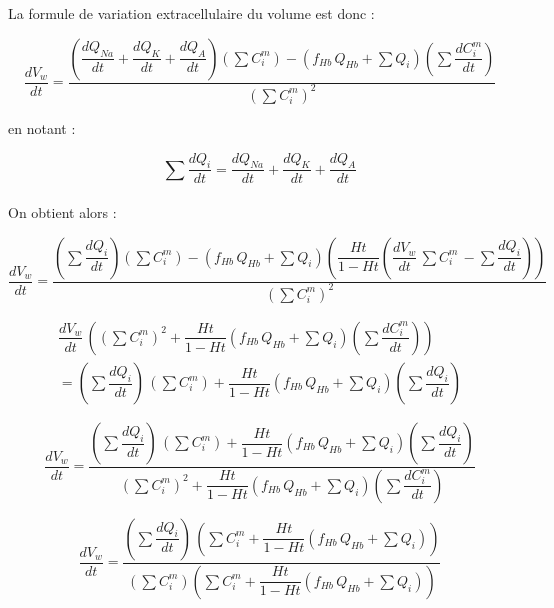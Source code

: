 \documentclass[a4paper,fleqn]{article}
\begin{document}
La formule de variation extracellulaire du volume est donc :

\begin{equation}
\dfrac{dV_w}{dt}=\dfrac{\left(\dfrac{dQ_{Na}}{dt}+\dfrac{dQ_K}{dt}+\dfrac{dQ_A}{dt}\right)\left(\sum C_{i}^m\right)-\left(f_{Hb}\,Q_{Hb}+\sum Q_{i}\right)\left(\sum \dfrac{dC_{i}^m}{dt}\right)}{\left(\sum C_{i}^m\right)^2}
\end{equation}

en notant :

\begin{equation}
\sum \dfrac{dQ_i}{dt}=\dfrac{dQ_{Na}}{dt}+\dfrac{dQ_K}{dt}+\dfrac{dQ_A}{dt}
\end{equation}\\

On obtient alors :

\begin{equation}
\dfrac{dV_w}{dt}=\dfrac{\left(\sum \dfrac{dQ_i}{dt}\right)\left(\sum C_{i}^m\right)-\left(f_{Hb}\,Q_{Hb}+\sum Q_{i}\right)\left(\dfrac{Ht}{1-Ht}\left(\dfrac{dV_w}{dt}\,\sum C_{i}^m\,-\sum \dfrac{dQ_i}{dt}\right)\right)}{\left(\sum C_{i}^m\right)^2}
\end{equation}

\begin{multline}
\dfrac{dV_w}{dt}\,\left(\left(\sum C_{i}^m\right)^2+\dfrac{Ht}{1-Ht}\left(f_{Hb}\,Q_{Hb}+\sum Q_{i}\right)\left(\sum \dfrac{dC_{i}^m}{dt}\right)\right)\\
=\left(\sum \dfrac{dQ_i}{dt}\right)\,\left(\sum C_{i}^m\right)+\dfrac{Ht}{1-Ht}\left(f_{Hb}\,Q_{Hb}+\sum Q_{i}\right)\left(\sum \dfrac{dQ_i}{dt}\right)
\end{multline}

\begin{equation}
\dfrac{dV_w}{dt}=\dfrac{\left(\sum \dfrac{dQ_i}{dt}\right)\,\left(\sum C_{i}^m\right)+\dfrac{Ht}{1-Ht}\left(f_{Hb}\,Q_{Hb}+\sum Q_{i}\right)\left(\sum \dfrac{dQ_i}{dt}\right)}{\left(\sum C_{i}^m\right)^2+\dfrac{Ht}{1-Ht}\left(f_{Hb}\,Q_{Hb}+\sum Q_{i}\right)\left(\sum \dfrac{dC_{i}^m}{dt}\right)}
\end{equation}

\begin{equation}
\dfrac{dV_w}{dt}=\dfrac{\left(\sum \dfrac{dQ_i}{dt}\right)\,\left(\sum C_{i}^m+\dfrac{Ht}{1-Ht}\left(f_{Hb}\,Q_{Hb}+\sum Q_{i}\right)\right)}{\left(\sum C_{i}^m\right)\left(\sum C_{i}^m+\dfrac{Ht}{1-Ht}\left(f_{Hb}\,Q_{Hb}+\sum Q_{i}\right)\right)}
\end{equation}
\end{document}
